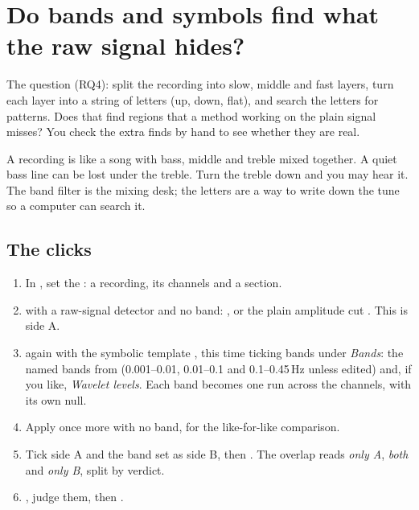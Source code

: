 \section{Do bands and symbols find what the raw signal hides?}\label{sec:workflows-rq4}
The question (RQ4): split the recording into slow, middle and fast layers, turn each layer
into a string of letters (up, down, flat), and search the letters for patterns. Does that
find regions that a method working on the plain signal misses? You check the extra finds by
hand to see whether they are real.

\begin{plainterms}
A recording is like a song with bass, middle and treble mixed together. A quiet bass line can
be lost under the treble. Turn the treble down and you may hear it. The band filter is the
mixing desk; the letters are a way to write down the tune so a computer can search it.
\end{plainterms}

\subsection*{The clicks}
\begin{enumerate}
\item In , set the : a recording, its channels and a section.
\item {} with a raw-signal detector and no band: ,
  or the plain amplitude cut . This is side A.
\item {} again with the symbolic template , this time
  ticking bands under \emph{Bands}: the named bands from 
  (0.001--0.01, 0.01--0.1 and 0.1--0.45\,Hz unless edited) and, if you like, \emph{Wavelet
  levels}. Each band becomes one run across the channels, with its own null.
\item Apply  once more with no band, for the like-for-like comparison.
\item Tick side A and the band set as side B, then . The overlap reads
  \emph{only A}, \emph{both} and \emph{only B}, split by verdict.
\item {}, judge them, then .
\end{enumerate}

